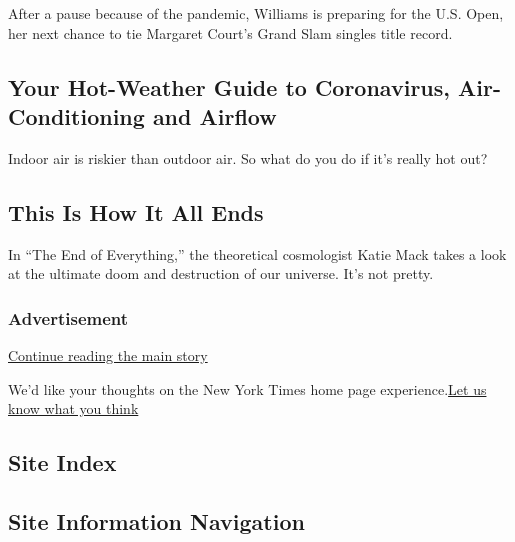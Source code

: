 After a pause because of the pandemic, Williams is preparing for the
U.S. Open, her next chance to tie Margaret Court's Grand Slam singles
title record.

\href{/2020/08/08/science/coronavirus-spread-air-conditioning.html}{}

\hypertarget{your-hot-weather-guide-to-coronavirus-air-conditioning-and-airflow}{%
\subsection{Your Hot-Weather Guide to Coronavirus, Air-Conditioning and
Airflow}\label{your-hot-weather-guide-to-coronavirus-air-conditioning-and-airflow}}

Indoor air is riskier than outdoor air. So what do you do if it's really
hot out?

\href{/2020/08/08/science/coronavirus-spread-air-conditioning.html}{}

\href{/2020/08/04/books/review/the-end-of-everything-katie-mack.html}{}

\hypertarget{this-is-how-it-all-ends}{%
\subsection{This Is How It All Ends}\label{this-is-how-it-all-ends}}

In ``The End of Everything,'' the theoretical cosmologist Katie Mack
takes a look at the ultimate doom and destruction of our universe. It's
not pretty.

\href{/2020/08/04/books/review/the-end-of-everything-katie-mack.html}{}

\hypertarget{advertisement}{%
\subsubsection{Advertisement}\label{advertisement}}

\protect\hyperlink{after-dfp-ad-mid1-large}{Continue reading the main
story}

We'd like your thoughts on the New York Times home page
experience.\href{http://nyt.qualtrics.com/jfe/form/SV_eFJmKj9v0krSE0l}{Let
us know what you think}

\hypertarget{site-index}{%
\subsection{Site Index}\label{site-index}}

\hypertarget{site-information-navigation}{%
\subsection{Site Information
Navigation}\label{site-information-navigation}}

